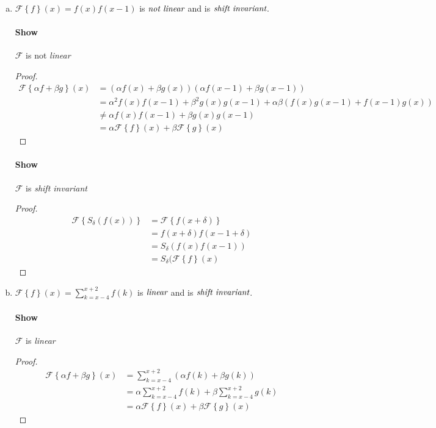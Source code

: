 \documentclass{paper}
\begin{document}
\begin{enumerate}[(a)]
\item $\mathcal{F} \left \{ f \right\} (x) = f(x)f(x-1)$ is $\emph{not linear}$ and is $\emph{shift invariant}$.

\paragraph{Show} $\mathcal{F}$ is not \emph{linear} \\
\begin{proof}
\begin{align*}
    \mathcal{F} \left \{\alpha f + \beta g \right\}(x)
    &= (\alpha f(x) + \beta g(x))(\alpha f(x-1) + \beta g(x-1)) \\
    &= \alpha^2 f(x)f(x-1) + \beta^2 g(x)g(x-1) + \alpha \beta (f(x)g(x-1)+f(x-1)g(x)) \\
    &\neq \alpha f(x)f(x-1) + \beta g(x)g(x-1) \\
    &= \alpha \mathcal{F} \left \{f\right\}(x) + \beta \mathcal{F} \left \{g \right\}(x)
\end{align*}
\end{proof}

\paragraph{Show} $\mathcal{F}$ is \emph{shift invariant} \\
\begin{proof}
\begin{align*}
    \mathcal{F} \left \{S_\delta (f(x)) \right\} 
    &= \mathcal{F} \left\{ f(x+\delta) \right\} \\
    &= f(x+\delta)f(x-1+\delta) \\
    &= S_{\delta}(f(x)f(x-1)) \\
    &= S_\delta(\mathcal{F}\left \{f \right\}(x)
\end{align*}
\end{proof}

\item $\mathcal{F} \left \{ f \right\} (x) = \sum_{k=x-4}^{x+2}f(k)$ is $\emph{linear}$ and is $\emph{shift invariant}$.

\paragraph{Show} $\mathcal{F}$ is \emph{linear} \\
\begin{proof}
\begin{align*}
    \mathcal{F} \left \{\alpha f + \beta g \right\}(x)
    &= \sum_{k=x-4}^{x+2}(\alpha f(k) + \beta g(k)) \\
    &= \alpha \sum_{k=x-4}^{x+2} f(k) + \beta \sum_{k=x-4}^{x+2} g(k) \\
    &= \alpha \mathcal{F} \left \{f\right\}(x) + \beta \mathcal{F} \left \{g \right\}(x)
\end{align*}
\end{proof}


\end{enumerate}
\end{document}
